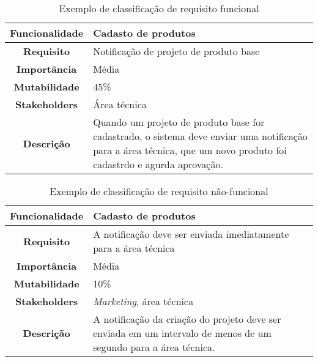     \begin{table}[h!]
      \centering
      \begin{tabular}{|c|p{10cm}|}
        \hline
        \textbf{Funcionalidade} &
        Cadasto de produtos \\ \hline
        \textbf{Requisito} &
        Notificação de projeto de produto base \\ \hline
        \textbf{Importância} &
        Média \\ \hline
        \textbf{Mutabilidade} &
        45\% \\ \hline
        \textbf{Stakeholders} &
        Área técnica \\ \hline
        \textbf{Descrição} &
        Quando um projeto de produto base for cadastrado, o sistema deve
        enviar uma notificação para a área técnica, que um novo produto
        foi cadastrdo e agurda aprovação. \\ \hline
      \end{tabular}
      \caption{Exemplo de classificação de requisito funcional}
      \label{Tabela:5}
    \end{table}

    \begin{table}[h!]
      \centering
      \begin{tabular}{|c|p{10cm}|}
        \hline
        \textbf{Funcionalidade} &
        Cadasto de produtos \\ \hline
        \textbf{Requisito} &
        A notificação deve ser enviada imediatamente para a área técnica \\ \hline
        \textbf{Importância} &
        Média \\ \hline
        \textbf{Mutabilidade} &
        10\% \\ \hline
        \textbf{Stakeholders} &
        \textit{Marketing}, área técnica \\ \hline
        \textbf{Descrição} &
        A notificação da criação do projeto deve ser enviada em um intervalo de
        menos de um segundo para a área técnica. \\ \hline
      \end{tabular}
      \caption{Exemplo de classificação de requisito não-funcional}
      \label{Tabela:6}
    \end{table}

